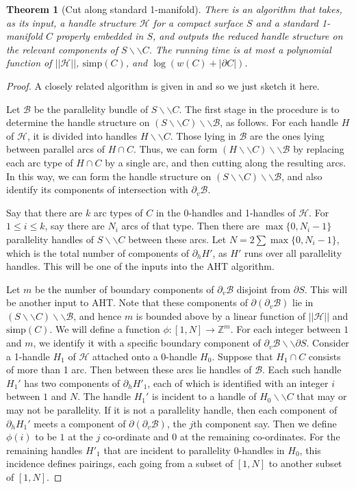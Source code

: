 \documentclass[oneside]{amsart}
\numberwithin{equation}{section}
\theoremstyle{plain}
\newtheorem{theorem}[equation]{Theorem}
\theoremstyle{definition}
\newcommand{\cut}{\backslash\backslash}
\newcommand{\calH}{\mathcal{H}}
\newcommand{\calB}{\mathcal{B}}
\begin{document}
\begin{theorem}[{\sc Cut along standard 1-manifold}]
\label{Thm:CutAlong1Manifold}
There is an algorithm that takes, as its input, a handle structure $\calH$ for a compact surface $S$ and a standard 1-manifold $C$ properly embedded in $S$, and outputs the reduced handle structure on the relevant components of $S \cut C$. The running time is at most a polynomial function of $||\calH||$, $\mathrm{simp}(C)$, and $\log (w(C) + |\partial C|)$.
\end{theorem}

\begin{proof} A closely related algorithm is given in \cite[Theorems 9.2 and 9.3]{Lackenby:Efficient} and so we just sketch it here.

Let $\calB$ be the parallelity bundle of $S \cut C$. The first stage in the procedure is to determine the handle structure on $(S \cut C) \cut \calB$, as follows. For each handle $H$ of $\calH$, it is divided into handles $H \cut C$. Those lying in $\calB$ are the ones lying between parallel arcs of $H \cap C$. Thus, we can form $(H \cut C) \cut \calB$ by replacing each arc type of $H \cap C$ by a single arc, and then cutting along the resulting arcs. In this way, we can form the handle structure on $(S \cut C) \cut \calB$, and also identify its components of intersection with $\partial_v \calB$.

Say that there are $k$ arc types of $C$ in the 0-handles and 1-handles of $\calH$. For $1 \leq i \leq k$, say there are $N_i$ arcs of that type. Then there are $\max \{ 0, N_i -1 \}$ parallelity handles of $S \cut C$ between these arcs. Let $N = 2 \sum \max \{ 0, N_i -1 \}$, which is the total number of components of $\partial_h H'$, as $H'$ runs over all parallelity handles. This will be one of the inputs into the {\sc AHT} algorithm. 

Let $m$ be the number of boundary components of $\partial_v \calB$ disjoint from $\partial S$. This will be another input to {\sc AHT}. Note that these components of $\partial (\partial_v \calB)$ lie in $(S \cut C) \cut \calB$, and hence $m$ is bounded above by a linear function of $||\calH||$ and $\mathrm{simp}(C)$. We will define a function $\phi \colon [1,N] \rightarrow \mathbb{Z}^m$. For each integer between $1$ and $m$, we identify it with a specific boundary component of $\partial_v \calB \cut \partial S$.
Consider a 1-handle $H_1$ of $\calH$ attached onto a 0-handle $H_0$. Suppose that $H_1 \cap C$ consists of more than 1 arc. Then between these arcs lie handles of $\calB$. Each such handle $H_1'$ has two components of $\partial_h H'_1$, each of which is identified with an integer $i$ between $1$ and $N$. The handle $H_1'$ is incident to a handle of $H_0 \cut C$ that may or may not be parallelity. If it is not a parallelity handle, then each component of $\partial_h H_1'$ meets a component of $\partial( \partial_v \calB)$, the $j$th component say. Then we define $\phi(i)$ to be $1$ at the $j$ co-ordinate and $0$ at the remaining co-ordinates. For the remaining handles $H'_1$ that are incident to parallelity 0-handles in $H_0$, this incidence defines pairings, each going from a subset of $[1,N]$ to another subset of $[1,N]$.


\end{proof}
\end{document}
